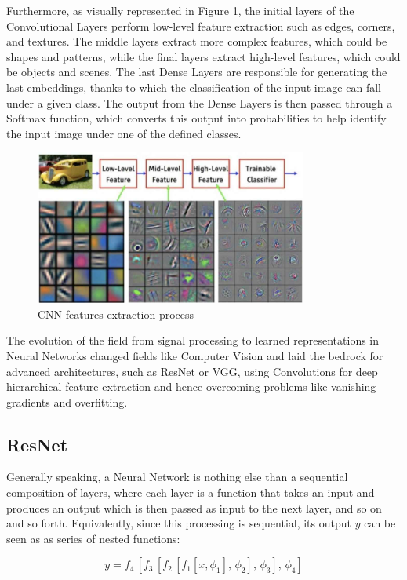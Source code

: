 Furthermore, as visually represented in Figure \ref{fig:CNNFeatures}, the initial layers of the Convolutional Layers perform low-level feature extraction such as edges, corners, and textures. The middle layers extract more complex features, which could be shapes and patterns, while the final layers extract high-level features, which could be objects and scenes. The last Dense Layers are responsible for generating the last embeddings, thanks to which the classification of the input image can fall under a given class. The output from the Dense Layers is then passed through a Softmax function, which converts this output into probabilities to help identify the input image under one of the defined classes.

\begin{figure}[ht]
    \centering
    \includegraphics[width=0.8\textwidth]{images/CNN Features.jpg}
    \caption[CNN feature extraction process]{CNN features extraction process}
    \label{fig:CNNFeatures}
\end{figure}

The evolution of the field from signal processing to learned representations in Neural Networks changed fields like Computer Vision and laid the bedrock for advanced architectures, such as ResNet or VGG, using Convolutions for deep hierarchical feature extraction and hence overcoming problems like vanishing gradients and overfitting.

\subsection{ResNet}
Generally speaking, a Neural Network is nothing else than a sequential composition of layers, where each layer is a function that takes an input and produces an output which is then passed as input to the next layer, and so on and so forth. Equivalently, since this processing is sequential, its output $y$ can be seen as as series of nested functions:
\begin{center}
    \[
        y = f_{4}\,[f_{3}\,[f_{2}\,[f_{1}[x, \phi_{1}],\,\phi_{2}],\,\phi_{3}],\,\phi_{4}]
    \]
\end{center}

